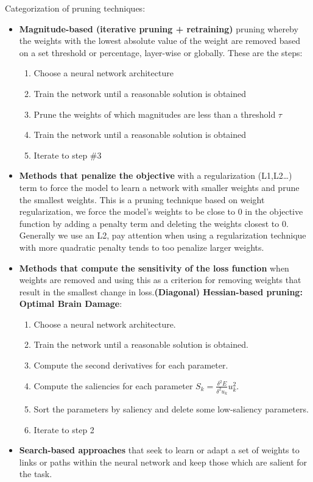 Categorization of pruning techniques:
\begin{itemize}
    \item \textbf{Magnitude-based (iterative pruning + retraining)} pruning whereby the weights with the lowest absolute value of
          the weight are removed based on a set threshold or percentage, layer-wise or globally.
          These are the steps:
          \begin{enumerate}
              \item Choose a neural network architecture
              \item Train the network until a reasonable solution is obtained
              \item Prune the weights of which magnitudes are less than a threshold $\tau$
              \item Train the network until a reasonable solution is obtained
              \item Iterate to step \#3
          \end{enumerate}
    \item \textbf{Methods that penalize the objective} with a regularization (L1,L2\dots) term to force the
          model to learn a network with smaller weights and prune the smallest weights.
          This is a pruning technique based on weight regularization, we force the
          model's weights to be close to 0 in the objective function by adding a penalty
          term and deleting the weights closest to 0. Generally we use an L2, pay attention
          when using a regularization technique with more quadratic penalty tends to
          too penalize larger weights.
    \item \textbf{Methods that compute the sensitivity of the loss function} when weights are
          removed and using this as a criterion for removing weights that result in the smallest
          change in loss.\textbf{(Diagonal) Hessian-based pruning: Optimal Brain Damage}:
          \begin{enumerate}
              \item Choose a neural network architecture.
              \item Train the network until a reasonable solution is obtained.
              \item Compute the second derivatives for each parameter.
              \item Compute the saliencies for each parameter $S_k = \frac{\delta^2E}{\delta^2 u_k} u_k^2$.
              \item Sort the parameters by saliency and delete some low-saliency parameters.
              \item Iterate to step 2
          \end{enumerate}
    \item \textbf{Search-based approaches} that seek to learn or adapt a set of weights to links
          or paths within the neural network and keep those which are salient for the task.
\end{itemize}

